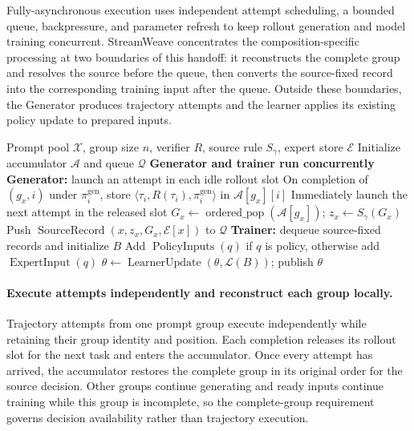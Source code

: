 \documentclass[letterpaper]{article}
\begin{document}
Fully-asynchronous execution uses independent attempt scheduling, a bounded queue, backpressure, and parameter refresh to keep rollout generation and model training concurrent.
StreamWeave concentrates the composition-specific processing at two boundaries of this handoff: it reconstructs the complete group and resolves the source before the queue, then converts the source-fixed record into the corresponding training input after the queue.
Outside these boundaries, the Generator produces trajectory attempts and the learner applies its existing policy update to prepared inputs.

\begin{algorithm}[t]
\caption{StreamWeave}
\label{alg:streamweave}
\begin{algorithmic}[1]
\REQUIRE Prompt pool $\mathcal{X}$, group size $n$, verifier $R$, source rule $S_\gamma$, expert store $\mathcal{E}$
\STATE Initialize accumulator $\mathcal{A}$ and queue $\mathcal{Q}$
\STATE \textbf{Generator and trainer run concurrently}
\STATE \textbf{Generator:} launch an attempt in each idle rollout slot
\STATE On completion of $(g_x,i)$ under $\pi_i^{\mathrm{gen}}$, store
$\langle\tau_i,R(\tau_i),\pi_i^{\mathrm{gen}}\rangle$ in $\mathcal{A}[g_x][i]$
\STATE Immediately launch the next attempt in the released slot
  \STATE $G_x\leftarrow\operatorname{ordered\_pop}(\mathcal{A}[g_x])$;
  $z_x\leftarrow S_\gamma(G_x)$
  \STATE Push $\operatorname{SourceRecord}(x,z_x,G_x,\mathcal{E}[x])$ to $\mathcal{Q}$
\ENDIF
\STATE \textbf{Trainer:} dequeue source-fixed records and initialize $B$
  \STATE Add $\operatorname{PolicyInputs}(q)$ if $q$ is policy, otherwise add $\operatorname{ExpertInput}(q)$
\ENDFOR
\STATE $\theta\leftarrow\operatorname{LearnerUpdate}(\theta,\mathcal{L}(B))$; publish $\theta$
\end{algorithmic}
\end{algorithm}

\paragraph{Execute attempts independently and reconstruct each group locally.}
Trajectory attempts from one prompt group execute independently while retaining their group identity and position.
Each completion releases its rollout slot for the next task and enters the accumulator.
Once every attempt has arrived, the accumulator restores the complete group in its original order for the source decision.
Other groups continue generating and ready inputs continue training while this group is incomplete, so the complete-group requirement governs decision availability rather than trajectory execution.
\end{document}
